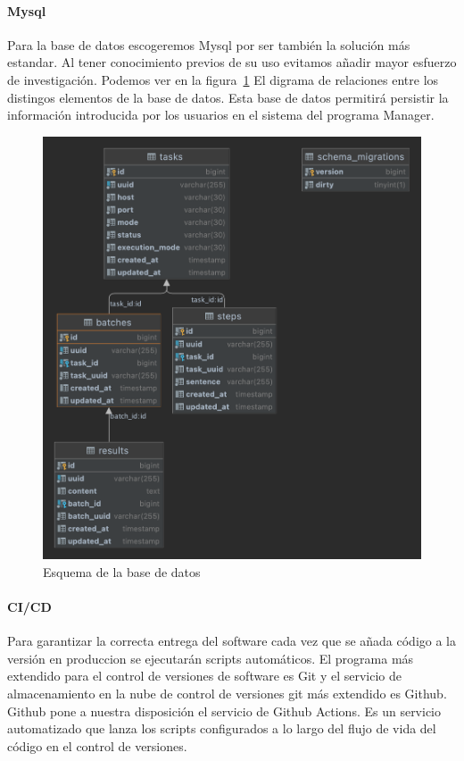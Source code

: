 \paragraph{Mysql}\label{par:mysql}
Para la base de datos escogeremos Mysql por ser también la solución más estandar.
Al tener conocimiento previos de su uso evitamos añadir mayor esfuerzo de investigación.
Podemos ver en la figura~\cref{fig:DBSchema} El digrama de relaciones entre los distingos elementos de la base de datos.
Esta base de datos permitirá persistir la información introducida por los usuarios en el sistema del programa Manager.\\

\begin{figure}[H]
    \centering
    \includegraphics[scale = 0.2]{part/Proyecto_ejecutivo/memoria_constructiva/dbSchema}
    \caption{Esquema de la base de datos}\label{fig:DBSchema}
\end{figure}

\paragraph{CI/CD}\label{par:cicd}
Para garantizar la correcta entrega del software cada vez que se añada código a la versión en produccion se ejecutarán scripts automáticos.
El programa más extendido para el control de versiones de software es Git y el servicio de almacenamiento en la nube de control de versiones git más extendido es Github.
Github pone a nuestra disposición el servicio de Github Actions.
Es un servicio automatizado que lanza los scripts configurados a lo largo del flujo de vida del código en el control de versiones.

